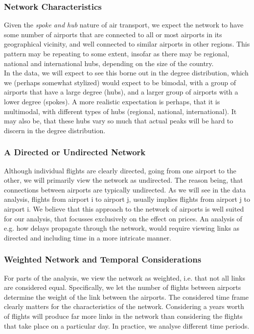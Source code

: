 \subsubsection{Network Characteristics}
Given the \textit{spoke and hub} nature of air transport, we expect the network to have some number of airports that are connected to all or most airports in its geographical vicinity, and well connected to similar airports in other regions. This pattern may be repeating to some extent, insofar as there may be regional, national and international hubs, depending on the size of the country. \\
In the data, we will expect to see this borne out in the degree distribution, which we (perhaps somewhat stylized) would expect to be bimodal, with a group of airports that have a large degree (hubs), and a larger group of airports with a lower degree (spokes). A more realistic expectation is perhaps, that it is multimodal, with different types of hubs (regional, national, international). It may also be, that these hubs vary so much that actual peaks will be hard to discern in the degree distribution.

\subsubsection{A Directed or Undirected Network}
Although individual flights are clearly directed, going from one airport to the other, we will primarily view the network as undirected. The reason being, that connections between airports are typically undirected.
As we will see in the data analysis, flights from airport i to airport j, usually implies flights from airport j to airport i. We believe that this approach to the network of airports is well suited for our analysis, that focusses exclusively on the effect on prices. An analysis of e.g. how delays propagate through the network, would require viewing links as directed and including time in a more intricate manner.\\

\subsubsection{Weighted Network and Temporal Considerations}
For parts of the analysis, we view the network as weighted, i.e. that not all links are considered equal. Specifically, we let the number of flights between airports determine the weight of the link between the airports.
\medskip
The considered time frame clearly matters for the characteristics of the network. Considering a years worth of flights will produce far more links in the network than considering the flights that take place on a particular day. In practice, we analyse different time periods.


